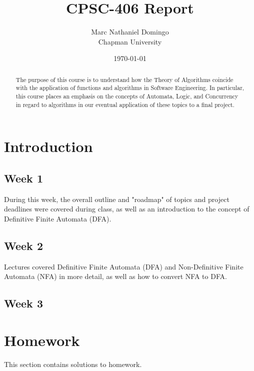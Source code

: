 \documentclass{article}
\title{CPSC-406 Report}
\author{Marc Nathaniel Domingo  \\ Chapman University}
\date{\today}
\theoremstyle{theorem}
\theoremstyle{definition}
\theoremstyle{remark}
\begin{document}
\maketitle

\begin{abstract}
The purpose of this course is to understand how the Theory of Algorithms coincide with the application of functions and algorithms in Software Engineering. In particular, this course places an emphasis on the concepts of Automata, Logic, and Concurrency in regard to algorithms in our eventual application of these topics to a final project. 
\end{abstract}

\tableofcontents

\section{Introduction}\label{intro}
\subsection{Week 1} During this week, the overall outline and "roadmap" of topics and project deadlines were covered during class, as well as an introduction to the concept of Definitive Finite Automata (DFA).
\subsection{Week 2} Lectures covered Definitive Finite Automata (DFA) and Non-Definitive Finite Automata (NFA) in more detail, as well as how to convert NFA to DFA.
\subsection{Week 3}
\section{Homework}\label{homework}

This section contains solutions to homework. 
\end{document}
